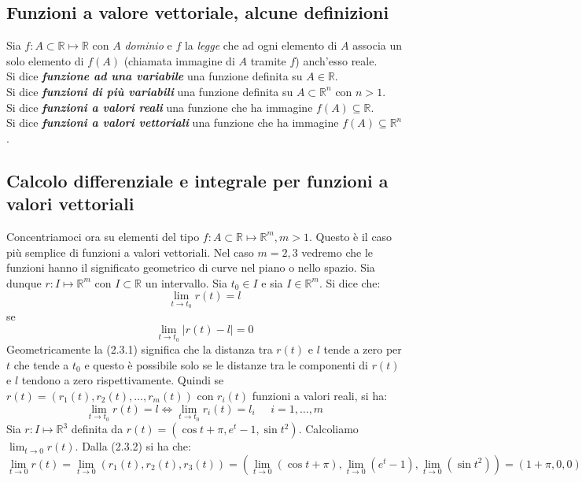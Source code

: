 \documentclass[a4paper]{article}
\numberwithin{equation}{subsection}
\begin{document}
\subsection{Funzioni a valore vettoriale, alcune definizioni}

\dfn{}
{   
    Sia $f : A \subset \mathbb{R} \mapsto \mathbb{R}$ con $A$ \textit{dominio} e $f$ la \textit{legge} che ad ogni elemento di $A$
    associa un solo elemento di $f(A)$ (chiamata immagine di $A$ tramite $f$) anch'esso reale.\\
    Si dice \textbf{\textit{funzione ad una variabile}} una funzione definita su $A \in \mathbb{R}$. \\
    Si dice \textbf{\textit{funzioni di più variabili}} una funzione definita su $A \subset \mathbb{R}^n$ con $n > 1$.\\
    Si dice \textbf{\textit{funzioni a valori reali}} una funzione che ha immagine $f(A) \subseteq \mathbb{R}$.\\
    Si dice \textbf{\textit{funzioni a valori vettoriali}} una funzione che ha immagine $f(A) \subseteq \mathbb{R}^n$.
}

\subsection{Calcolo differenziale e integrale per funzioni a valori vettoriali}

Concentriamoci ora su elementi del tipo $f : A \subset \mathbb{R} \mapsto \mathbb{R}^m, m > 1$. 
Questo è il caso più semplice di funzioni a valori vettoriali. Nel caso $m = 2,3$ 
vedremo che le funzioni hanno il significato geometrico di curve nel piano o nello spazio. 
Sia dunque $r:  I \mapsto \mathbb{R}^m$ con $I \subset \mathbb{R}$ un intervallo. Sia $t_0 \in I$ e sia $I \in \mathbb{R}^m$.
\dfn{}
{
    Si dice che:
    \[\lim_{t\rightarrow t_0} r(t) = l\]
    se
    \begin{equation}
        \lim_{t\rightarrow t_0} |r(t) - l| = 0
    \end{equation}
}
\noindent
Geometricamente la (2.3.1) significa che la distanza tra $r(t)$ e $l$ tende a zero per $t$ che tende a $t_0$ e questo
è possibile solo se le distanze tra le componenti di $r(t)$ e $l$ tendono a zero rispettivamente.
Quindi se $r(t) = (r_1(t), r_2(t), \dots, r_m(t))$ con $r_i(t)$ funzioni a valori reali, si ha:
\begin{equation}
    \lim_{t\rightarrow t_0} r(t) = l \Longleftrightarrow \lim_{t\rightarrow t_0} r_i(t) = l_i \; \; \; \; \; i = 1, \dots, m  
\end{equation}
\ex{}
{
    Sia $r: I \mapsto \mathbb{R}^3$ definita da $r(t) = (\cos{t} + \pi, e^t - 1, \sin{t^2})$. 
    Calcoliamo $\lim_{t \rightarrow 0} r(t)$. 
    Dalla (2.3.2) si ha che:
    \[\lim_{t \rightarrow 0} r(t) = \lim_{t \rightarrow 0} (r_1(t), r_2(t), r_3(t)) = \left(\lim_{t \rightarrow 0}(\cos{t} + \pi), \lim_{t \rightarrow 0} (e^{t} - 1), \lim_{t \rightarrow 0} (\sin{t^2})\right) = (1+\pi, 0, 0)\]
}
\end{document}

